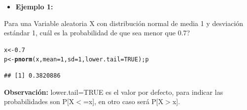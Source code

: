 \documentclass[12pt,letterpaper]{article}\usepackage[]{graphicx}\usepackage[]{color}
\makeatletter
\newcommand{\hlnum}[1]{\textcolor[rgb]{0.686,0.059,0.569}{#1}}%
\newcommand{\hlstd}[1]{\textcolor[rgb]{0.345,0.345,0.345}{#1}}%
\newcommand{\hlkwb}[1]{\textcolor[rgb]{0.69,0.353,0.396}{#1}}%
\newcommand{\hlkwc}[1]{\textcolor[rgb]{0.333,0.667,0.333}{#1}}%
\newcommand{\hlkwd}[1]{\textcolor[rgb]{0.737,0.353,0.396}{\textbf{#1}}}%
\newenvironment{kframe}{%
 \def\at@end@of@kframe{}%
 \ifinner\ifhmode%
  \def\at@end@of@kframe{\end{minipage}}%
  \begin{minipage}{\columnwidth}%
 \fi\fi%
 \def\FrameCommand##1{\hskip\@totalleftmargin \hskip-\fboxsep
 \colorbox{shadecolor}{##1}\hskip-\fboxsep
     \hskip-\linewidth \hskip-\@totalleftmargin \hskip\columnwidth}%
 \MakeFramed {\advance\hsize-\width
   \@totalleftmargin\z@ \linewidth\hsize
   \@setminipage}}%
 {\par\unskip\endMakeFramed%
 \at@end@of@kframe}
\newenvironment{knitrout}{}{} %
\makeatother
\begin{document}
\begin{itemize}
  \item \textbf{Ejemplo 1:}
\end{itemize}
Para una Variable aleatoria X con distribuci\'on normal de media 1 y desviaci\'on 
est\'andar 1, cu\'al es la probabilidad de que sea menor que 0.7?
\begin{knitrout}
\color{fgcolor}\begin{kframe}
\begin{alltt}
\hlstd{x} \hlkwb{<-} \hlnum{0.7}
\hlstd{p} \hlkwb{<-} \hlkwd{pnorm}\hlstd{(x,} \hlkwc{mean}\hlstd{=}\hlnum{1}\hlstd{,} \hlkwc{sd}\hlstd{=}\hlnum{1}\hlstd{,} \hlkwc{lower.tail} \hlstd{=} \hlnum{TRUE}\hlstd{); p}
\end{alltt}
\begin{verbatim}
## [1] 0.3820886
\end{verbatim}
\end{kframe}
\end{knitrout}
\textbf{Observaci\'on:} lower.tail=TRUE es el valor por defecto, para indicar las probabilidades son P[X$<$=x], en otro caso ser\'a P[X$>$x].
\end{document}
